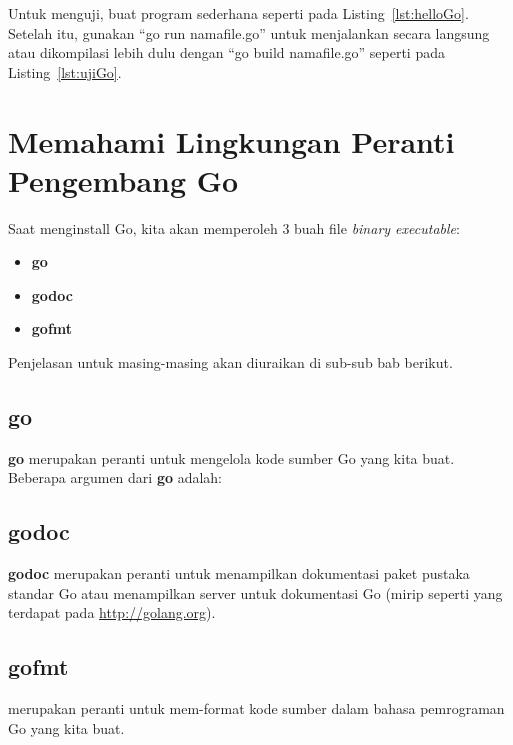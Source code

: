 Untuk menguji, buat program sederhana seperti pada Listing~\ref{lst:helloGo}. Setelah itu, gunakan ``go run namafile.go'' untuk menjalankan secara langsung atau dikompilasi lebih dulu dengan ``go build namafile.go'' seperti pada Listing~\ref{lst:ujiGo}.
	




\section{Memahami Lingkungan Peranti Pengembang Go}

Saat menginstall Go, kita akan memperoleh 3 buah file \textit{binary executable}:
\begin{itemize}
	\item \textbf{go}
	\item \textbf{godoc}
	\item \textbf{gofmt}
\end{itemize}

Penjelasan untuk masing-masing akan diuraikan di sub-sub bab berikut.

\subsection{go}

\textbf{go} merupakan peranti untuk mengelola kode sumber Go yang kita buat. Beberapa argumen dari \textbf{go} adalah:



\subsection{godoc}

\textbf{godoc} merupakan peranti untuk menampilkan dokumentasi paket pustaka standar Go atau menampilkan server untuk dokumentasi Go (mirip seperti yang terdapat pada \url{http://golang.org}).



\subsection{gofmt}

 merupakan peranti untuk mem-format kode sumber dalam bahasa pemrograman Go yang kita buat.






